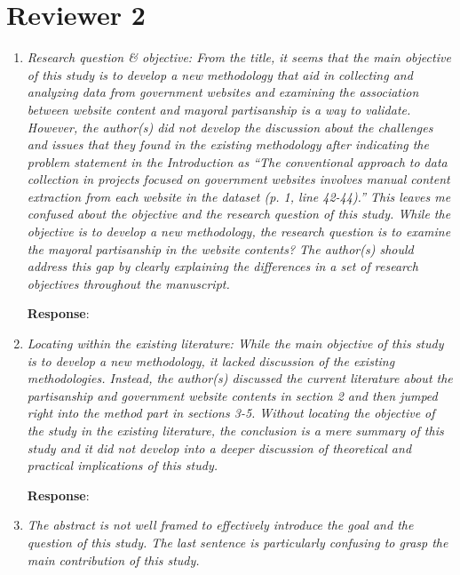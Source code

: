 \documentclass[12pt,titlepage]{article}
\begin{document}
\section*{Reviewer 2}

\begin{enumerate}


\item \emph{  Research question & objective: From the title, it seems that the main objective of this study is to develop a new methodology that aid in collecting and analyzing data from government websites and examining the association between website content and mayoral partisanship is a way to validate. However, the author(s) did not develop the discussion about the challenges and issues that they found in the existing methodology after indicating the problem statement in the Introduction as “The conventional approach to data collection in projects focused on government websites involves manual content extraction from each website in the dataset (p. 1, line 42-44).” This leaves me confused about the objective and the research question of this study. While the objective is to develop a new methodology, the research question is to examine the mayoral partisanship in the website contents? The author(s) should address this gap by clearly explaining the differences in a set of research objectives throughout the manuscript.}
 
    \textbf{Response}: 
    

\item \emph{ Locating within the existing literature: While the main objective of this study is to develop a new methodology, it lacked discussion of the existing methodologies. Instead, the author(s) discussed the current literature about the partisanship and government website contents in section 2 and then jumped right into the method part in sections 3-5. Without locating the objective of the study in the existing literature, the conclusion is a mere summary of this study and it did not develop into a deeper discussion of theoretical and practical implications of this study.}
    
    
    \textbf{Response}: 
    
    

\item \emph{The abstract is not well framed to effectively introduce the goal and the question of this study. The last sentence is particularly confusing to grasp the main contribution of this study.}


\end{enumerate}
\end{document}
